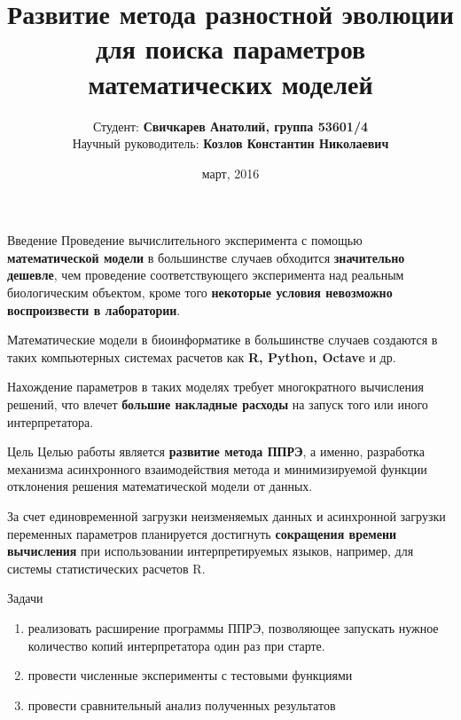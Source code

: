 \documentclass{beamer}
\begin{document}
\title[Развитие ППРЭ]
{Развитие метода разностной эволюции
для поиска параметров математических моделей}
\author[Свичкарев Анатолий]
{Студент: \textbf{Свичкарев Анатолий, группа 53601/4}\\
Научный руководитель: \textbf{Козлов Константин Николаевич}}
\date{март, 2016}

\frame{\titlepage} 

\begin{frame}{Введение}
    Проведение вычислительного эксперимента
    с помощью \textbf{математической модели}
    в большинстве случаев обходится \textbf{значительно дешевле},
    чем проведение соответствующего эксперимента
    над реальным биологическим объектом,
    кроме того \textbf{некоторые условия
    невозможно воспроизвести в лаборатории}.
    \bigskip

    Математические модели в биоинформатике в
    большинстве случаев создаются в таких компьютерных
    системах расчетов как \textbf{R, Python, Octave} и др.
    \bigskip

    Нахождение параметров в таких моделях требует
    многократного вычисления решений, что влечет
    \textbf{большие накладные расходы} на запуск того или иного
    интерпретатора.
\end{frame}

\begin{frame}{Цель}
    Целью работы является
    \textbf{развитие метода ППРЭ},
    а именно, разработка механизма
    асинхронного взаимодействия метода
    и минимизируемой функции отклонения
    решения математической модели от данных.

    \bigskip
    За счет единовременной загрузки
    неизменяемых данных и
    асинхронной загрузки переменных параметров
    планируется достигнуть
    \textbf{сокращения времени вычисления}
    при использовании
    интерпретируемых языков, например,
    для системы статистических расчетов R.
\end{frame}

\begin{frame}{Задачи}
\begin{enumerate}
    \itemsep 2em
    \item реализовать расширение программы ППРЭ,
        позволяющее запускать нужное количество копий
        интерпретатора один раз при старте.
    \item провести численные эксперименты с тестовыми функциями
    \item провести сравнительный анализ полученных результатов
\end{enumerate}
\end{frame}
\end{document}

